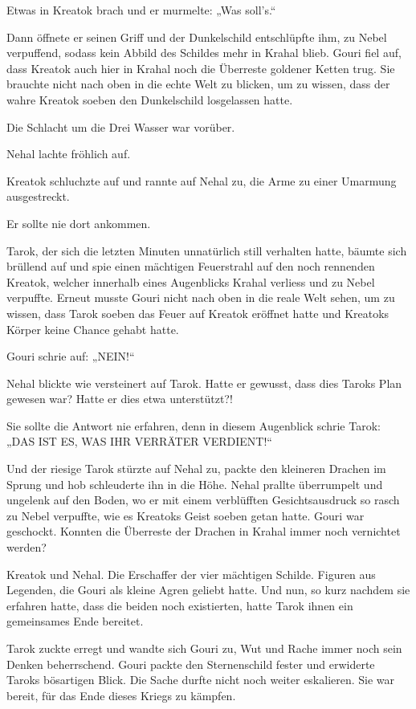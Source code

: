 \documentclass[10pt, a4paper, oneside]{book}
\begin{document}
Etwas in Kreatok brach und er murmelte: „Was soll’s.“

Dann öffnete er seinen Griff und der Dunkelschild entschlüpfte ihm, zu Nebel verpuffend, sodass kein Abbild des Schildes mehr in Krahal blieb. Gouri fiel auf, dass Kreatok auch hier in Krahal noch die Überreste goldener Ketten trug. Sie brauchte nicht nach oben in die echte Welt zu blicken, um zu wissen, dass der wahre Kreatok soeben den Dunkelschild losgelassen hatte.

Die Schlacht um die Drei Wasser war vorüber.

Nehal lachte fröhlich auf.

Kreatok schluchzte auf und rannte auf Nehal zu, die Arme zu einer Umarmung ausgestreckt.

Er sollte nie dort ankommen.

Tarok, der sich die letzten Minuten unnatürlich still verhalten hatte, bäumte sich brüllend auf und spie einen mächtigen Feuerstrahl auf den noch rennenden Kreatok, welcher innerhalb eines Augenblicks Krahal verliess und zu Nebel verpuffte. Erneut musste Gouri nicht nach oben in die reale Welt sehen, um zu wissen, dass Tarok soeben das Feuer auf Kreatok eröffnet hatte und Kreatoks Körper keine Chance gehabt hatte.

Gouri schrie auf: „NEIN!“

Nehal blickte wie versteinert auf Tarok. Hatte er gewusst, dass dies Taroks Plan gewesen war? Hatte er dies etwa unterstützt?!

Sie sollte die Antwort nie erfahren, denn in diesem Augenblick schrie Tarok: „DAS IST ES, WAS IHR VERRÄTER VERDIENT!“

Und der riesige Tarok stürzte auf Nehal zu, packte den kleineren Drachen im Sprung und hob schleuderte ihn in die Höhe. Nehal prallte überrumpelt und ungelenk auf den Boden, wo er mit einem verblüfften Gesichtsausdruck so rasch zu Nebel verpuffte, wie es Kreatoks Geist soeben getan hatte. Gouri war geschockt. Konnten die Überreste der Drachen in Krahal immer noch vernichtet werden?

Kreatok und Nehal. Die Erschaffer der vier mächtigen Schilde. Figuren aus Legenden, die Gouri als kleine Agren geliebt hatte. Und nun, so kurz nachdem sie erfahren hatte, dass die beiden noch existierten, hatte Tarok ihnen ein gemeinsames Ende bereitet.

Tarok zuckte erregt und wandte sich Gouri zu, Wut und Rache immer noch sein Denken beherrschend. Gouri packte den Sternenschild fester und erwiderte Taroks bösartigen Blick. Die Sache durfte nicht noch weiter eskalieren. Sie war bereit, für das Ende dieses Kriegs zu kämpfen.\bigskip
\end{document}
